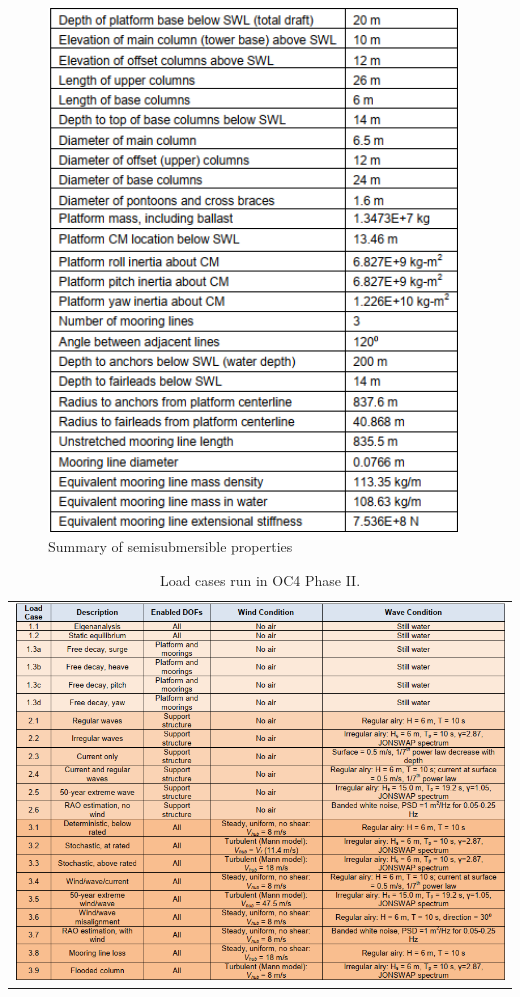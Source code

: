 \documentclass[a4paper, 11pt]{article}
\begin{document}
\begin{figure}[H]
\begin{minipage}{0.5\textwidth}
        \includegraphics[width=0.97\textwidth]{characteristics.png}
        \caption{\small Summary of semisubmersible properties \cite{Robertson2014}}
        \label{fig:characteristics}
    \end{minipage}
\end{figure}

\begin{table}[H]
    \centering
    \caption{Load cases run in OC4 Phase II. \cite{Robertson2014}}
    \label{tab:image_table}
    \begin{tabular}{c}
        \includegraphics[width=1\textwidth]{table_3.png} \\
    \end{tabular}
\end{table}
\end{document}
